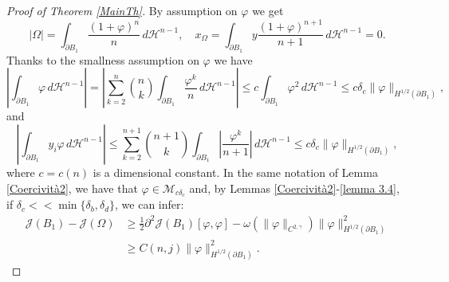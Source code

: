 \documentclass[oneside,a4paper,11pt,notitlepage]{article}
\newcommand{\abs}[1]{{\left|#1\right|}}
\theoremstyle{definition}
\theoremstyle{plain}
\theoremstyle{definition}
\begin{document}
\begin{proof}[Proof of Theorem \ref{MainTh}]
    By assumption on $\varphi$ we get
    \begin{equation*}
        \abs{\Omega}=\int_{\partial B_1}\frac{(1+\varphi)^n}{n}\,d\mathcal{H}^{n-1},\quad x_\Omega=\int_{\partial B_1}y\frac{(1+\varphi)^{n+1}}{n+1}\,d\mathcal{H}^{n-1}=0.
    \end{equation*}
    Thanks to the smallness assumption on $\varphi$ we have
    \begin{equation*}
        \abs{\int_{\partial B_1}\varphi\,d\mathcal{H}^{n-1}}=\abs{\sum_{k=2}^{n}\binom{n}{k}\int_{\partial B_1}\frac{\varphi^k}{n}\,d\mathcal{H}^{n-1}}\leq c\int_{\partial B_1}\varphi^2\,d\mathcal{H}^{n-1}\leq c\delta_c\|\varphi\|_{H^{1/2}(\partial B_1)},
    \end{equation*}
    and
    \begin{equation*}
        \abs{\int_{\partial B_1}y_i\varphi\,d\mathcal{H}^{n-1}}\leq\sum_{k=2}^{n+1}\binom{n+1}{k}\int_{\partial B_1}\abs{\frac{\varphi^k}{n+1}}\,d\mathcal{H}^{n-1}\leq c\delta_c\|\varphi\|_{H^{1/2}(\partial B_1)},
    \end{equation*}
    where $c=c(n)$ is a dimensional constant. In the same notation of Lemma \ref{Coercività2}, we have that $\varphi\in\mathcal{M}_{c\delta_c}$ and, by Lemmas \ref{Coercività2}-\ref{lemma 3.4}, if $\delta_c<<\min\{\delta_b, \delta_d\}$, we can infer:
    \begin{equation*}
        \begin{split}
            \mathcal{J}(B_1)-\mathcal{J}(\Omega)&\geq \frac{1}{2}\partial^2\mathcal{J}(B_1)[\varphi,\varphi]-\omega(\|\varphi\|_{C^{2,\gamma}})\|\varphi\|_{H^{1/2}(\partial B_1)}^2\\
            &\geq C(n,j)\|\varphi\|_{H^{1/2}(\partial B_1)}^2.
        \end{split}
    \end{equation*}
\end{proof}

\appendix
\end{document}
